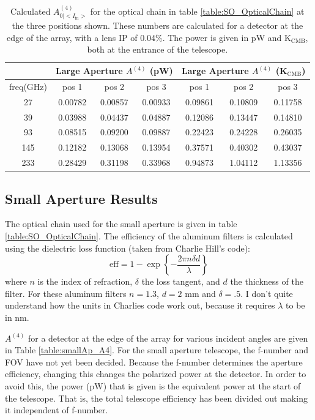 \documentclass{article}
\theoremstyle{remark}
\renewcommand{\t}[1]{\text{#1}}
\newcommand{\AI}{A^{(4)}_{0|<I_{\t{in}}>}}
\newcommand{\A}[1]{A^{(#1)}}
\begin{document}
\begin{table}
\centering
\begin{tabular}{ |c|c|c|c|c|c|c| } 
  \hline
   & \multicolumn{3}{|c|}{Large Aperture $\A4$ (pW)} & \multicolumn{3}{|c|}{Large Aperture $\A4$ (K$_\t{CMB}$)}\\ 
  \hline
  freq(GHz) & pos 1   & pos 2 & pos 3 & pos 1 & pos 2 & pos 3\\ \hline
27 & 0.00782 & 0.00857 & 0.00933 & 0.09861 & 0.10809 & 0.11758 \\
39 & 0.03988 & 0.04437 & 0.04887 & 0.12086 & 0.13447 & 0.14810 \\
93 & 0.08515 & 0.09200 & 0.09887 & 0.22423 & 0.24228 & 0.26035 \\
145 & 0.12182 & 0.13068 & 0.13954 & 0.37571 & 0.40302 & 0.43037 \\
233 & 0.28429 & 0.31198 & 0.33968 & 0.94873 & 1.04112 & 1.13356 \\
  \hline  
\end{tabular}
\caption{ Calculated $\AI$ for the optical chain in table \ref{table:SO_OpticalChain} at the three positions shown.
These numbers are calculated for a detector at the edge of the array, with a lens IP of 0.04\%.
The power is given in pW and K$_\text{CMB}$, both at the entrance of the telescope.
}
\label{table:SO_powers}
\end{table}


\subsection{Small Aperture Results}

The optical chain used for the small aperture is given in table \ref{table:SO_OpticalChain}. 
The efficiency of the aluminum filters is calculated using the dielectric loss function (taken from Charlie Hill's code):
\[\t{eff} = 1 - \exp\left\{- \frac{2 \pi n \delta d}{\lambda}\right\}\]
where $n$ is the index of refraction, $\delta$ the loss tangent, and $d$ the thickness of the filter.
For these aluminum filters $n = 1.3$, $d = 2\text{ mm}$ and $\delta = .5$. 
I don't quite understand how the units in Charlies code work out, because it requires $\lambda$ to be in nm.

$\A4$ for a detector at the edge of the array for various incident angles are given in Table \ref{table:smallAp_A4}.
For the small aperture telescope, the f-number and FOV have not yet been decided. 
Because the f-number determines the aperture efficiency, changing this changes the polarized power at the detector.
In order to avoid this, the power (pW) that is given is the equivalent power at the start of the telescope.
That is, the total telescope efficiency has been divided out making it independent of f-number.
\end{document}
